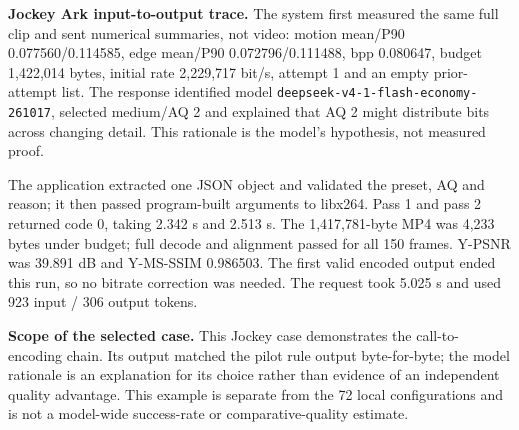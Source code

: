 \documentclass[10pt,a4paper]{article}
\begin{document}
\textbf{Jockey Ark input-to-output trace.} The system first measured the same full clip and sent numerical summaries, not video: motion mean/P90 0.077560/0.114585, edge mean/P90 0.072796/0.111488, bpp 0.080647, budget 1,422,014 bytes, initial rate 2,229,717 bit/s, attempt 1 and an empty prior-attempt list. The response identified model \texttt{deepseek-v4-1-flash-economy-261017}, selected medium/AQ 2 and explained that AQ 2 might distribute bits across changing detail. This rationale is the model's hypothesis, not measured proof.

The application extracted one JSON object and validated the preset, AQ and reason; it then passed program-built arguments to libx264. Pass 1 and pass 2 returned code 0, taking 2.342 s and 2.513 s. The 1,417,781-byte MP4 was 4,233 bytes under budget; full decode and alignment passed for all 150 frames. Y-PSNR was 39.891 dB and Y-MS-SSIM 0.986503. The first valid encoded output ended this run, so no bitrate correction was needed. The request took 5.025 s and used 923 input / 306 output tokens.

\textbf{Scope of the selected case.} This Jockey case demonstrates the call-to-encoding chain. Its output matched the pilot rule output byte-for-byte; the model rationale is an explanation for its choice rather than evidence of an independent quality advantage. This example is separate from the 72 local configurations and is not a model-wide success-rate or comparative-quality estimate.
\clearpage
\end{document}
